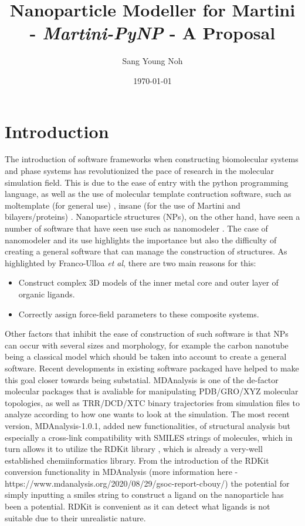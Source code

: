 \documentclass[12pt]{article}
\begin{document}
\title{Nanoparticle Modeller for Martini - \emph{Martini-PyNP} - A Proposal}
\author{Sang Young Noh}
\date{\today}
\maketitle
\section{Introduction}
The introduction of software frameworks when constructing biomolecular systems and phase systems has revolutionized the pace of research in the
molecular simulation field. This is due to the ease of entry with the python programming language, as well as the use of molecular template contruction software,
such as moltemplate (for general use) \cite{Moltemplate}, insane (for the use of Martini and bilayers/proteins) \cite{INSANE}. Nanoparticle structures (NPs),
on the other hand, have seen a number of software that have seen use such as nanomodeler \cite{Nanomodeller}. The case of nanomodeler and its use highlights the importance but also the difficulty of creating a general software that can manage the construction of structures. As highlighted by Franco-Ulloa \emph{et al}, there are two main reasons for this:
\begin{itemize}
\item Construct complex 3D models of the inner metal core and outer layer of organic ligands.
\item Correctly assign force-field parameters to these composite systems.
\end{itemize} 
Other factors that inhibit the ease of construction of such software is that NPs can occur with several sizes and morphology, for example the carbon nanotube being a classical
model which should be taken into account to create a general software. 
\newline
\newline
Recent developments in existing software packaged have helped to make this goal closer towards being substatial. MDAnalysis is one of the de-factor molecular packages that
is avaliable for manipulating PDB/GRO/XYZ molecular topologies, as well as TRR/DCD/XTC binary trajectories from simulation files to analyze according to how one wants to look at the simulation. 
The most recent version, MDAnalysis-1.0.1, added new functionalities, of structural analysis but especially a cross-link compatibility with SMILES strings of molecules, which in turn
allows it to utilize the RDKit library \cite{Rdkit}, which is already a very-well established chemiinformatics library. From the introduction of the RDKit conversion functionality in MDAnalysis (more information here - https://www.mdanalysis.org/2020/08/29/gsoc-report-cbouy/) the potential for simply inputting a smiles string to construct a ligand on the nanoparticle has been a potential. RDKit is convenient as it can detect what ligands is not suitable due to their unrealistic nature.
\end{document}
